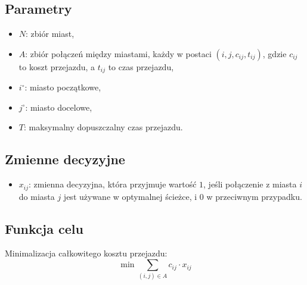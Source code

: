 \documentclass[12pt, letterpaper]{article}
\begin{document}
\subsection{Parametry}
\begin{itemize}
  \item \( N \): zbiór miast,
  \item \( A \): zbiór połączeń między miastami, każdy w postaci \( (i, j,
        c_{ij}, t_{ij}) \), gdzie \( c_{ij} \) to koszt przejazdu, a \( t_{ij}
        \) to czas przejazdu,
  \item \( i^\circ \): miasto początkowe,
  \item \( j^\circ \): miasto docelowe,
  \item \( T \): maksymalny dopuszczalny czas przejazdu.
\end{itemize}

\subsection{Zmienne decyzyjne}
\begin{itemize}
  \item \( x_{ij} \): zmienna decyzyjna, która przyjmuje wartość \( 1 \),
        jeśli połączenie z miasta \( i \) do miasta \( j \) jest używane w
        optymalnej
        ścieżce, i \( 0 \) w przeciwnym przypadku.
\end{itemize}

\subsection{Funkcja celu}
Minimalizacja całkowitego kosztu przejazdu:
\[
  \min \sum_{(i, j) \in A} c_{ij} \cdot x_{ij}
\]
\end{document}
